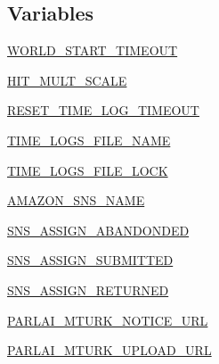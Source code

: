\subsection*{Variables}
\begin{DoxyCompactItemize}
\item 
\hyperlink{namespaceparlai_1_1mturk_1_1core_1_1legacy__2018_1_1mturk__manager_ad2927f9a057e3b3e999920903ce209bf}{W\+O\+R\+L\+D\+\_\+\+S\+T\+A\+R\+T\+\_\+\+T\+I\+M\+E\+O\+UT}
\item 
\hyperlink{namespaceparlai_1_1mturk_1_1core_1_1legacy__2018_1_1mturk__manager_ad27f1a479683356bea673617429f4770}{H\+I\+T\+\_\+\+M\+U\+L\+T\+\_\+\+S\+C\+A\+LE}
\item 
\hyperlink{namespaceparlai_1_1mturk_1_1core_1_1legacy__2018_1_1mturk__manager_a87cdb9f1d4a34e9d4dce7c0b3cf4bf3a}{R\+E\+S\+E\+T\+\_\+\+T\+I\+M\+E\+\_\+\+L\+O\+G\+\_\+\+T\+I\+M\+E\+O\+UT}
\item 
\hyperlink{namespaceparlai_1_1mturk_1_1core_1_1legacy__2018_1_1mturk__manager_acf670bf3e13a0cb64f34e1b581b32a2e}{T\+I\+M\+E\+\_\+\+L\+O\+G\+S\+\_\+\+F\+I\+L\+E\+\_\+\+N\+A\+ME}
\item 
\hyperlink{namespaceparlai_1_1mturk_1_1core_1_1legacy__2018_1_1mturk__manager_a75db3e17ddd67fa679724a68127afd99}{T\+I\+M\+E\+\_\+\+L\+O\+G\+S\+\_\+\+F\+I\+L\+E\+\_\+\+L\+O\+CK}
\item 
\hyperlink{namespaceparlai_1_1mturk_1_1core_1_1legacy__2018_1_1mturk__manager_ac87a1955daba24adcc7bc7773c730e9f}{A\+M\+A\+Z\+O\+N\+\_\+\+S\+N\+S\+\_\+\+N\+A\+ME}
\item 
\hyperlink{namespaceparlai_1_1mturk_1_1core_1_1legacy__2018_1_1mturk__manager_a455535131f2e91bd4cd24f96ebe636f1}{S\+N\+S\+\_\+\+A\+S\+S\+I\+G\+N\+\_\+\+A\+B\+A\+N\+D\+O\+N\+D\+ED}
\item 
\hyperlink{namespaceparlai_1_1mturk_1_1core_1_1legacy__2018_1_1mturk__manager_aa39ceb1dc73a3475f0cd5dc5efc41f25}{S\+N\+S\+\_\+\+A\+S\+S\+I\+G\+N\+\_\+\+S\+U\+B\+M\+I\+T\+T\+ED}
\item 
\hyperlink{namespaceparlai_1_1mturk_1_1core_1_1legacy__2018_1_1mturk__manager_a352552220921124c383c1eea5d4568d3}{S\+N\+S\+\_\+\+A\+S\+S\+I\+G\+N\+\_\+\+R\+E\+T\+U\+R\+N\+ED}
\item 
\hyperlink{namespaceparlai_1_1mturk_1_1core_1_1legacy__2018_1_1mturk__manager_a1a521c3bcb143664ff6db2102565dcad}{P\+A\+R\+L\+A\+I\+\_\+\+M\+T\+U\+R\+K\+\_\+\+N\+O\+T\+I\+C\+E\+\_\+\+U\+RL}
\item 
\hyperlink{namespaceparlai_1_1mturk_1_1core_1_1legacy__2018_1_1mturk__manager_a60e6483427799994a114a6c65065fc6e}{P\+A\+R\+L\+A\+I\+\_\+\+M\+T\+U\+R\+K\+\_\+\+U\+P\+L\+O\+A\+D\+\_\+\+U\+RL}

\end{DoxyCompactItemize}
